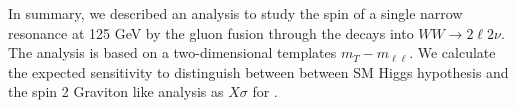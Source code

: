 In summary, we described an analysis to study the spin of a single narrow 
resonance at 125 GeV by the gluon fusion through the decays into $WW\to 2\ell2\nu$.  
The analysis is based on a two-dimensional templates $m_T-m_{\ell\ell}$. 
We calculate the expected sensitivity to distinguish between 
between SM Higgs hypothesis and the spin 2 Graviton like analysis as 
$X\sigma$ for \intlumiEightTeV.  
